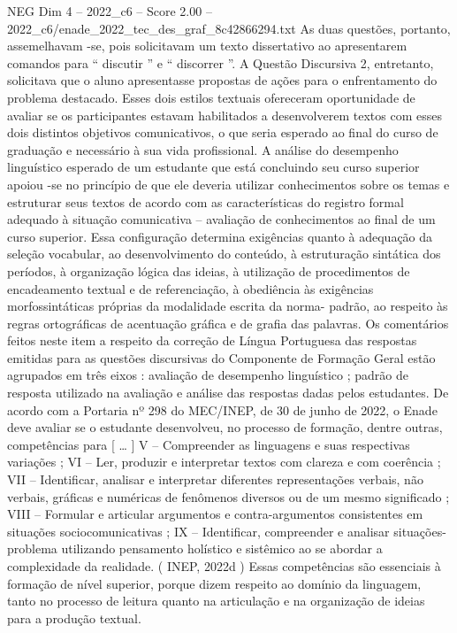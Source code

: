\begin{textsample}{NEG Dim 4 – 2022\_c6 – Score 2.00 – 2022\_c6/enade\_2022\_tec\_des\_graf\_8c42866294.txt}
As duas questões, portanto, assemelhavam -se, pois solicitavam um texto dissertativo ao apresentarem comandos para “ discutir ” e “ discorrer ”.
A Questão Discursiva 2, entretanto, solicitava que o aluno apresentasse propostas de ações para o enfrentamento do problema destacado.
Esses dois estilos textuais ofereceram oportunidade de avaliar se os participantes estavam habilitados a desenvolverem textos com esses dois distintos objetivos comunicativos, o que seria esperado ao final do curso de graduação e necessário à sua vida profissional.
A análise do desempenho linguístico esperado de um estudante que está concluindo seu curso superior apoiou -se no princípio de que ele deveria utilizar conhecimentos sobre os temas e estruturar seus textos de acordo com as características do registro formal adequado à situação comunicativa – avaliação de conhecimentos ao final de um curso superior.
Essa configuração determina exigências quanto à adequação da seleção vocabular, ao desenvolvimento do conteúdo, à estruturação sintática dos períodos, à organização lógica das ideias, à utilização de procedimentos de encadeamento textual e de referenciação, à obediência às exigências morfossintáticas próprias da modalidade escrita da norma- padrão, ao respeito às regras ortográficas de acentuação gráfica e de grafia das palavras.
Os comentários feitos neste item a respeito da correção de Língua Portuguesa das respostas emitidas para as questões discursivas do Componente de Formação Geral estão agrupados em três eixos : avaliação de desempenho linguístico ; padrão de resposta utilizado na avaliação e análise das respostas dadas pelos estudantes.
De acordo com a Portaria nº 298 do MEC/INEP, de 30 de junho de 2022, o Enade deve avaliar se o estudante desenvolveu, no processo de formação, dentre outras, competências para [ … ] V – Compreender as linguagens e suas respectivas variações ; VI – Ler, produzir e interpretar textos com clareza e com coerência ; VII – Identificar, analisar e interpretar diferentes representações verbais, não verbais, gráficas e numéricas de fenômenos diversos ou de um mesmo significado ; VIII – Formular e articular argumentos e contra-argumentos consistentes em situações sociocomunicativas ; IX – Identificar, compreender e analisar situações-problema utilizando pensamento holístico e sistêmico ao se abordar a complexidade da realidade. ( INEP, 2022d ) Essas competências são essenciais à formação de nível superior, porque dizem respeito ao domínio da linguagem, tanto no processo de leitura quanto na articulação e na organização de ideias para a produção textual.

\end{textsample}
